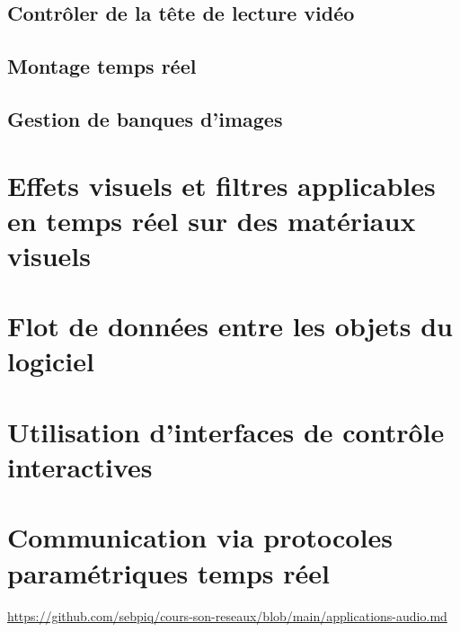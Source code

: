 \documentclass[
  french,
]{book}
\begin{document}
\hypertarget{contruxf4ler-de-la-tuxeate-de-lecture-viduxe9o}{%
\subsection{Contrôler de la tête de lecture vidéo}\label{contruxf4ler-de-la-tuxeate-de-lecture-viduxe9o}}

\hypertarget{montage-temps-ruxe9el}{%
\subsection{Montage temps réel}\label{montage-temps-ruxe9el}}

\hypertarget{gestion-de-banques-dimages}{%
\subsection{Gestion de banques d'images}\label{gestion-de-banques-dimages}}

\hypertarget{effets-visuels-et-filtres-applicables-en-temps-ruxe9el-sur-des-matuxe9riaux-visuels}{%
\section{Effets visuels et filtres applicables en temps réel sur des matériaux visuels}\label{effets-visuels-et-filtres-applicables-en-temps-ruxe9el-sur-des-matuxe9riaux-visuels}}

\hypertarget{flot-de-donnuxe9es-entre-les-objets-du-logiciel}{%
\section{Flot de données entre les objets du logiciel}\label{flot-de-donnuxe9es-entre-les-objets-du-logiciel}}

\hypertarget{interagir_interfaces}{%
\section{Utilisation d'interfaces de contrôle interactives}\label{interagir_interfaces}}

\hypertarget{interagir_protocoles}{%
\section{Communication via protocoles paramétriques temps réel}\label{interagir_protocoles}}

\url{https://github.com/sebpiq/cours-son-reseaux/blob/main/applications-audio.md}
\end{document}
